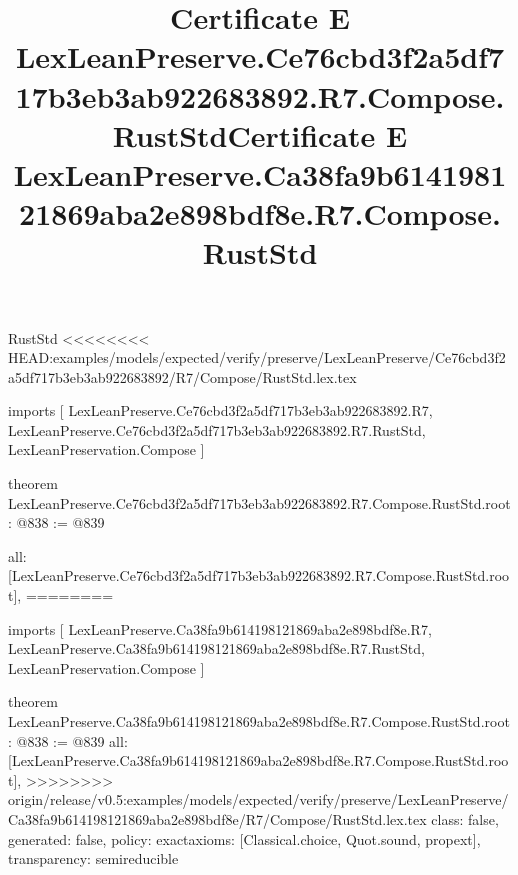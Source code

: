 \begin{lexlean}{RustStd}
<<<<<<<< HEAD:examples/models/expected/verify/preserve/LexLeanPreserve/Ce76cbd3f2a5df717b3eb3ab922683892/R7/Compose/RustStd.lex.tex
\title{Certificate E LexLeanPreserve.Ce76cbd3f2a5df717b3eb3ab922683892.R7.Compose.RustStd}
\begin{coremodule}
imports [
  LexLeanPreserve.Ce76cbd3f2a5df717b3eb3ab922683892.R7,
  LexLeanPreserve.Ce76cbd3f2a5df717b3eb3ab922683892.R7.RustStd,
  LexLeanPreservation.Compose
]

theorem LexLeanPreserve.Ce76cbd3f2a5df717b3eb3ab922683892.R7.Compose.RustStd.root : @838 := @839 {
  all: [LexLeanPreserve.Ce76cbd3f2a5df717b3eb3ab922683892.R7.Compose.RustStd.root],
========
\title{Certificate E LexLeanPreserve.Ca38fa9b614198121869aba2e898bdf8e.R7.Compose.RustStd}
\begin{coremodule}
imports [
  LexLeanPreserve.Ca38fa9b614198121869aba2e898bdf8e.R7,
  LexLeanPreserve.Ca38fa9b614198121869aba2e898bdf8e.R7.RustStd,
  LexLeanPreservation.Compose
]

theorem LexLeanPreserve.Ca38fa9b614198121869aba2e898bdf8e.R7.Compose.RustStd.root : @838 := @839 {
  all: [LexLeanPreserve.Ca38fa9b614198121869aba2e898bdf8e.R7.Compose.RustStd.root],
>>>>>>>> origin/release/v0.5:examples/models/expected/verify/preserve/LexLeanPreserve/Ca38fa9b614198121869aba2e898bdf8e/R7/Compose/RustStd.lex.tex
  class: false,
  generated: false,
  policy: exact{axioms: [Classical.choice, Quot.sound, propext]},
  transparency: semireducible
}


\end{coremodule}}
\end{coremodule}
\end{lexlean}
